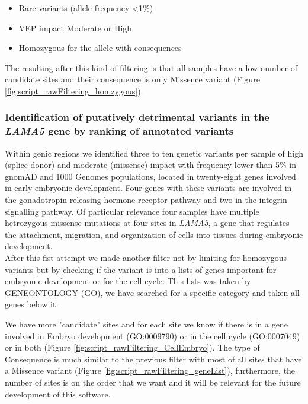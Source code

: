 \documentclass[
tikz,
11pt, %
oneside, %
english, %
singlespacing, %
headsepline, %
]{MastersDoctoralThesisV2} %
\begin{document}
\begin{itemize}
\item Rare variants (allele frequency <1\%)
\item VEP impact Moderate or High 
\item Homozygous for the allele with consequences
\end{itemize}

The resulting after this kind of filtering is that all samples have a low number of candidate sites and their consequence  is only Missence variant (Figure \ref{fig:script_rawFiltering_homzygous}).

\subsubsection{Identification of putatively detrimental variants in the \textit{LAMA5} gene by ranking of annotated variants}

Within genic regions we identified three to ten genetic variants per sample of high (splice-donor) and moderate (missense) impact with frequency lower than 5\% in gnomAD and 1000 Genomes populations, located in twenty-eight genes involved in early embryonic development. Four genes with these variants are involved in the gonadotropin-releasing hormone receptor pathway and two in the integrin signalling pathway. Of particular relevance four samples have multiple hetrozygous missense mutations at four sites in \textit{LAMA5}, a gene that regulates the attachment, migration, and organization of cells into tissues during embryonic development.\\


After this fist attempt we made another filter not by limiting for homozygous variants but by checking if the variant is into a lists of genes important for embryonic development or for the cell cycle. This lists was taken by GENEONTOLOGY (\href{http://geneontology.org/}{GO}), we have searched for a specific category and taken all genes below it.

We have more "candidate" sites and for each site we know if there is in a gene involved in Embryo development (GO:0009790) or in the cell cycle (GO:0007049) or in both (Figure \ref{fig:script_rawFiltering_CellEmbryo}). The type of Consequence is much similar to the previous filter with most of all sites that have a Missence variant (Figure \ref{fig:script_rawFiltering_geneList}), furthermore, the number of sites is on the order that we want and it will be relevant for the future development of this software.
\end{document}
